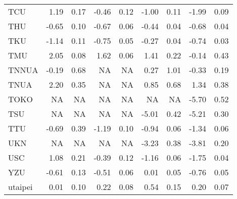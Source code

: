 \begin{longtable}[t]{lrrrrrrrr}
\hspace{1em}TCU & 1.19 & 0.17 & -0.46 & 0.12 & -1.00 & 0.11 & -1.99 & 0.09\\
\hspace{1em}THU & -0.65 & 0.10 & -0.67 & 0.06 & -0.44 & 0.04 & -0.68 & 0.04\\
\hspace{1em}TKU & -1.14 & 0.11 & -0.75 & 0.05 & -0.27 & 0.04 & -0.74 & 0.03\\
\hspace{1em}TMU & 2.05 & 0.08 & 1.62 & 0.06 & 1.41 & 0.22 & -0.14 & 0.43\\
\hspace{1em}TNNUA & -0.19 & 0.68 & NA & NA & 0.27 & 1.01 & -0.33 & 0.19\\
\hspace{1em}TNUA & 2.20 & 0.35 & NA & NA & 0.85 & 0.68 & 1.34 & 0.38\\
\hspace{1em}TOKO & NA & NA & NA & NA & NA & NA & -5.70 & 0.52\\
\hspace{1em}TSU & NA & NA & NA & NA & -5.01 & 0.42 & -5.21 & 0.30\\
\hspace{1em}TTU & -0.69 & 0.39 & -1.19 & 0.10 & -0.94 & 0.06 & -1.34 & 0.06\\
\hspace{1em}UKN & NA & NA & NA & NA & -3.23 & 0.38 & -3.81 & 0.20\\
\hspace{1em}USC & 1.08 & 0.21 & -0.39 & 0.12 & -1.16 & 0.06 & -1.75 & 0.04\\
\hspace{1em}YZU & -0.61 & 0.13 & -0.51 & 0.06 & 0.01 & 0.05 & -0.76 & 0.05\\
\hspace{1em}utaipei & 0.01 & 0.10 & 0.22 & 0.08 & 0.54 & 0.15 & 0.20 & 0.07\\*
\end{longtable}
